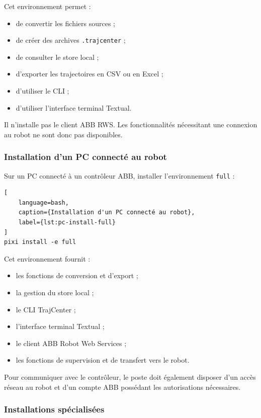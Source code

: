 \documentclass{rapportENSAM}
\begin{document}
Cet environnement permet :

\begin{itemize}
    \item de convertir les fichiers sources ;
    \item de créer des archives \texttt{.trajcenter} ;
    \item de consulter le store local ;
    \item d'exporter les trajectoires en CSV ou en Excel ;
    \item d'utiliser le CLI ;
    \item d'utiliser l'interface terminal Textual.
\end{itemize}

Il n'installe pas le client ABB RWS. Les fonctionnalités nécessitant une
connexion au robot ne sont donc pas disponibles.


\subsubsection{Installation d'un PC connecté au robot}
\label{subsubsec:pc-full-installation}

Sur un PC connecté à un contrôleur ABB, installer l'environnement
\texttt{full} :

\begin{lstlisting}[
    language=bash,
    caption={Installation d'un PC connecté au robot},
    label={lst:pc-install-full}
]
pixi install -e full
\end{lstlisting}

Cet environnement fournit :

\begin{itemize}
    \item les fonctions de conversion et d'export ;
    \item la gestion du store local ;
    \item le CLI TrajCenter ;
    \item l'interface terminal Textual ;
    \item le client ABB Robot Web Services ;
    \item les fonctions de supervision et de transfert vers le robot.
\end{itemize}

Pour communiquer avec le contrôleur, le poste doit également disposer d'un
accès réseau au robot et d'un compte ABB possédant les autorisations
nécessaires.


\subsubsection{Installations spécialisées}
\label{subsubsec:pc-specialized-installation}
\end{document}

